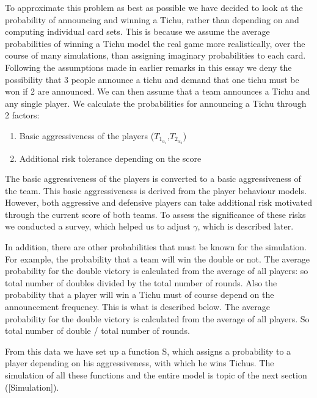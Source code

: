 To approximate this problem as best as possible we have decided to look at the probability of announcing and winning a Tichu, rather than depending on and computing individual card sets. This is because we assume the average probabilities of winning a Tichu model the real game more realistically, over the course of many simulations, than assigning imaginary probabilities to each card. Following the assumptions made in earlier remarks in this essay we deny the possibility that 3 people announce a tichu and demand that one tichu must be won if 2 are announced. We can then assume that a team announces a Tichu and any single player. We calculate the probabilities for announcing a Tichu through 2 factors:
\begin{enumerate}
\item Basic aggressiveness of the players ($T_{1_{\alpha_1}}$,$T_{2_{\alpha_2}}$)
\item  Additional risk tolerance depending on the score
\end{enumerate}
The basic aggressiveness of the players is converted to a basic aggressiveness of the team. This basic aggressiveness is derived from the player behaviour models. However, both aggressive and defensive players can take additional risk motivated through the current score of both teams. To assess the significance of these risks we conducted a survey, which helped us to adjust $\gamma$, which is described later.

In addition, there are other probabilities that must be known for the simulation. For example, the probability that a team will win the double or not. The average probability for the double victory is calculated from the average of all players: so total number of doubles divided by the total number of rounds. Also the probability that a player will win a Tichu must of course depend on the announcement frequency. This is what is described below.
The average probability for the double victory is calculated from the average of all players. So total number of double / total number of rounds.

From this data we have set up a function S, which assigns a probability to a player depending on his aggressiveness, with which he wins Tichus. The simulation of all these functions and the entire model is topic  of the next section ([Simulation]).

